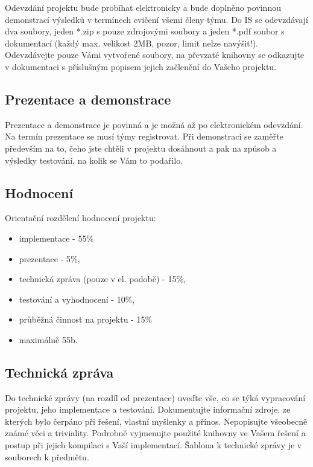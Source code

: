 \documentclass[11pt, a4paper, titlepage]{article}
\begin{document}
Odevzdání projektu bude probíhat elektronicky a bude doplněno povinnou demonstrací výsledků v termínech cvičení všemi členy týmu. Do IS se odevzdávají dva soubory, jeden *.zip s pouze zdrojovými soubory a jeden *.pdf soubor s dokumentací (každý max. velikost 2MB, pozor, limit nelze navýšit!). Odevzdávejte pouze Vámi vytvořené soubory, na převzaté knihovny se odkazujte v dokumentaci s příslušným popisem jejich začlenění do Vašeho projektu.


\subsection*{Prezentace a demonstrace}

Prezentace a demonstrace je povinná a je možná až po elektronickém odevzdání. Na termín prezentace se musí týmy registrovat. Při demonstraci se zaměřte především na to, čeho jste chtěli v projektu dosáhnout a pak na způsob a výsledky testování, na kolik se Vám to podařilo.


\subsection*{Hodnocení}

Orientační rozdělení hodnocení projektu:
\begin{itemize}
	\item implementace - 55\%
	\item prezentace - 5\%,
	\item technická zpráva (pouze v el. podobě) - 15\%,
	\item testování a vyhodnocení - 10\%,
	\item průběžná činnost na projektu - 15\%
	\item maximálně 55b.
\end{itemize}


\subsection*{Technická zpráva}

Do technické zprávy (na rozdíl od prezentace) uveďte vše, co se týká vypracování projektu, jeho implementace a testování. Dokumentujte informační zdroje, ze kterých bylo čerpáno při řešení, vlastní myšlenky a přínos. Nepopisujte všeobecně známé věci a triviality. Podrobně vyjmenujte použité knihovny ve Vašem řešení a postup při jejich kompilaci s Vaší implementací. Šablona k technické zprávy je v souborech k předmětu.
\end{document}
